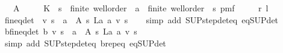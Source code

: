 \begin{isabellebody}
\ \ \ A\ \isanewline
\ \ \ \ K\ {\isacharcolon}{\kern0pt}{\isacharcolon}{\kern0pt}\ {\isachardoublequoteopen}{\isacharprime}{\kern0pt}s\ {\isacharcolon}{\kern0pt}{\isacharcolon}{\kern0pt}\ {\isacharbraceleft}{\kern0pt}finite{\isacharcomma}{\kern0pt}\ wellorder{\isacharbraceright}{\kern0pt}\ {\isasymtimes}\ {\isacharprime}{\kern0pt}a\ {\isacharcolon}{\kern0pt}{\isacharcolon}{\kern0pt}\ {\isacharbraceleft}{\kern0pt}finite{\isacharcomma}{\kern0pt}\ wellorder{\isacharbraceright}{\kern0pt}\ {\isasymRightarrow}\ {\isacharprime}{\kern0pt}s\ pmf{\isachardoublequoteclose}\isanewline
\ \ \ \ \ r\ l\isanewline
{}\isanewline
\isanewline
{}\isamarkupfalse%
\ {\isasymL}{\isacharunderscore}{\kern0pt}fin{\isacharunderscore}{\kern0pt}eq{\isacharunderscore}{\kern0pt}det{\isacharcolon}{\kern0pt}\ {\isachardoublequoteopen}{\isasymL}\ v\ s\ {\isacharequal}{\kern0pt}\ {\isacharparenleft}{\kern0pt}{\isasymSqunion}a\ {\isasymin}\ A\ s{\isachardot}{\kern0pt}\ L\isactrlsub a\ a\ v\ s{\isacharparenright}{\kern0pt}{\isachardoublequoteclose}\isanewline
%
\isadelimproof
\ \ %
\endisadelimproof
%
\isatagproof
{}\isamarkupfalse%
\ {\isacharparenleft}{\kern0pt}simp\ add{\isacharcolon}{\kern0pt}\ SUP{\isacharunderscore}{\kern0pt}step{\isacharunderscore}{\kern0pt}det{\isacharunderscore}{\kern0pt}eq\ {\isasymL}{\isacharunderscore}{\kern0pt}eq{\isacharunderscore}{\kern0pt}SUP{\isacharunderscore}{\kern0pt}det{\isacharparenright}{\kern0pt}%
\endisatagproof
{\isafoldproof}%
%
\isadelimproof
\isanewline
%
\endisadelimproof
\isanewline
{}\isamarkupfalse%
\ {\isasymL}\isactrlsub b{\isacharunderscore}{\kern0pt}fin{\isacharunderscore}{\kern0pt}eq{\isacharunderscore}{\kern0pt}det{\isacharcolon}{\kern0pt}\ {\isachardoublequoteopen}{\isasymL}\isactrlsub b\ v\ s\ {\isacharequal}{\kern0pt}\ {\isacharparenleft}{\kern0pt}{\isasymSqunion}a\ {\isasymin}\ A\ s{\isachardot}{\kern0pt}\ L\isactrlsub a\ a\ v\ s{\isacharparenright}{\kern0pt}{\isachardoublequoteclose}\isanewline
%
\isadelimproof
\ \ %
\endisadelimproof
%
\isatagproof
{}\isamarkupfalse%
\ {\isacharparenleft}{\kern0pt}simp\ add{\isacharcolon}{\kern0pt}\ SUP{\isacharunderscore}{\kern0pt}step{\isacharunderscore}{\kern0pt}det{\isacharunderscore}{\kern0pt}eq\ {\isasymL}\isactrlsub b{\isachardot}{\kern0pt}rep{\isacharunderscore}{\kern0pt}eq\ {\isasymL}{\isacharunderscore}{\kern0pt}eq{\isacharunderscore}{\kern0pt}SUP{\isacharunderscore}{\kern0pt}det{\isacharparenright}{\kern0pt}%
\endisatagproof
{\isafoldproof}%
%
\isadelimproof
\isanewline

\end{isabellebody}
